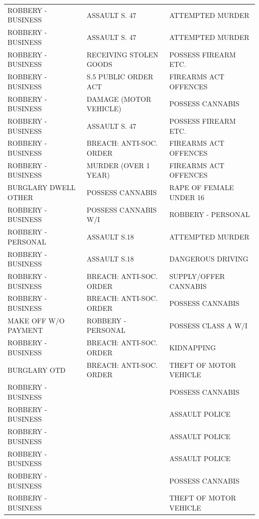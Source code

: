\documentclass[conference]{IEEEtran}
\theoremstyle{definition}
\begin{document}
\begin{table}[!ht]
{\begin{tabular}{lll}
    ROBBERY - BUSINESS   & ASSAULT S. 47           & ATTEMPTED MURDER        \\
    ROBBERY - BUSINESS   & ASSAULT S. 47           & ATTEMPTED MURDER        \\
    ROBBERY - BUSINESS   & RECEIVING STOLEN GOODS  & POSSESS FIREARM ETC.    \\
    ROBBERY - BUSINESS   & S.5 PUBLIC ORDER ACT    & FIREARMS ACT OFFENCES   \\
    ROBBERY - BUSINESS   & DAMAGE (MOTOR VEHICLE)  & POSSESS CANNABIS        \\
    ROBBERY - BUSINESS   & ASSAULT S. 47           & POSSESS FIREARM ETC.    \\
    ROBBERY - BUSINESS   & BREACH: ANTI-SOC. ORDER & FIREARMS ACT OFFENCES   \\
    ROBBERY - BUSINESS   & MURDER (OVER 1 YEAR)    & FIREARMS ACT OFFENCES   \\
    BURGLARY DWELL OTHER & POSSESS CANNABIS        & RAPE OF FEMALE UNDER 16 \\
    ROBBERY - BUSINESS   & POSSESS CANNABIS W/I    & ROBBERY - PERSONAL      \\
    ROBBERY - PERSONAL   & ASSAULT S.18            & ATTEMPTED MURDER        \\
    ROBBERY - BUSINESS   & ASSAULT S.18            & DANGEROUS DRIVING      \\
    ROBBERY - BUSINESS   & BREACH: ANTI-SOC. ORDER & SUPPLY/OFFER CANNABIS  \\
    ROBBERY - BUSINESS   & BREACH: ANTI-SOC. ORDER & POSSESS CANNABIS       \\
    MAKE OFF W/O PAYMENT & ROBBERY - PERSONAL      & POSSESS CLASS A W/I    \\
    ROBBERY - BUSINESS   & BREACH: ANTI-SOC. ORDER & KIDNAPPING             \\
    BURGLARY OTD         & BREACH: ANTI-SOC. ORDER & THEFT OF MOTOR VEHICLE \\
    ROBBERY - BUSINESS   &       & POSSESS CANNABIS       \\
    ROBBERY - BUSINESS   &       & ASSAULT POLICE         \\
    ROBBERY - BUSINESS   &       & ASSAULT POLICE         \\
    ROBBERY - BUSINESS   &       & ASSAULT POLICE         \\
    ROBBERY - BUSINESS   &       & POSSESS CANNABIS       \\
    ROBBERY - BUSINESS   &       & THEFT OF MOTOR VEHICLE \\

\end{tabular}}
\end{table}
\end{document}
